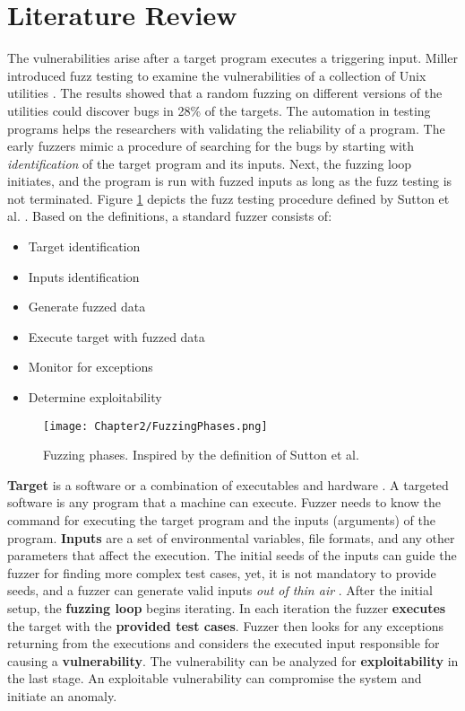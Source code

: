 \section{Literature Review} \label{sec:2.2}

The vulnerabilities arise after a target program executes a triggering input. Miller introduced fuzz testing to examine the vulnerabilities of a collection of Unix utilities \cite{miller1990empirical}. The results showed that a random fuzzing on different versions of the utilities could discover bugs in 28\% of the targets. The automation in testing programs helps the researchers with validating the reliability of a program. The early fuzzers mimic a procedure of searching for the bugs by starting with \textit{identification} of the target program and its inputs. Next, the fuzzing loop initiates, and the program is run with fuzzed inputs as long as the fuzz testing is not terminated. Figure \ref{fig:fuzz_phases} depicts the fuzz testing procedure defined by Sutton et al. \cite{sutton2007fuzzing}. Based on the definitions, a standard fuzzer consists of:

\begin{itemize}
    \item Target identification
    \item Inputs identification
    \item Generate fuzzed data
    \item Execute target with fuzzed data
    \item Monitor for exceptions
    \item Determine exploitability
\end{itemize}

\begin{figure}[!b]
    \texttt{[image: Chapter2/FuzzingPhases.png]}
    \centering
    \caption{Fuzzing phases. Inspired by the definition of Sutton et al. \cite{sutton2007fuzzing}}
    \label{fig:fuzz_phases}
\end{figure}

\textbf{Target} is a software or a combination of executables and hardware \cite{song2019periscope}. A targeted software is any program that a machine can execute. 
Fuzzer needs to know the command for executing the target program and the inputs (arguments) of the program. \textbf{Inputs} are a set of environmental variables, file formats, and any other parameters that affect the execution. The initial seeds of the inputs can guide the fuzzer for finding more complex test cases, yet, it is not mandatory to provide seeds, and a fuzzer can generate valid inputs \textit{out of thin air} \cite{out_of_thin_air}. After the initial setup, the \textbf{fuzzing loop} begins iterating. In each iteration the fuzzer \textbf{executes} the target with the \textbf{provided test cases}. Fuzzer then looks for any exceptions returning from the executions and considers the executed input responsible for causing a \textbf{vulnerability}. The vulnerability can be analyzed for \textbf{exploitability} in the last stage. An exploitable vulnerability can compromise the system and initiate an anomaly.

